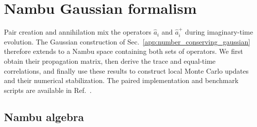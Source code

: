 \section{Nambu Gaussian formalism}
\label{app:paired_gaussian}

Pair creation and annihilation mix the operators $\hat a_i$ and $\hat a_i^+$ during imaginary-time evolution. The Gaussian construction of Sec.~\ref{app:number_conserving_gaussian} therefore extends to a Nambu space containing both sets of operators. We first obtain their propagation matrix, then derive the trace and equal-time correlations, and finally use these results to construct local Monte Carlo updates and their numerical stabilization. The paired implementation and benchmark scripts are available in Ref.~\cite{bafqmc_code}.

\subsection{Nambu algebra}
\label{app:algebra}

